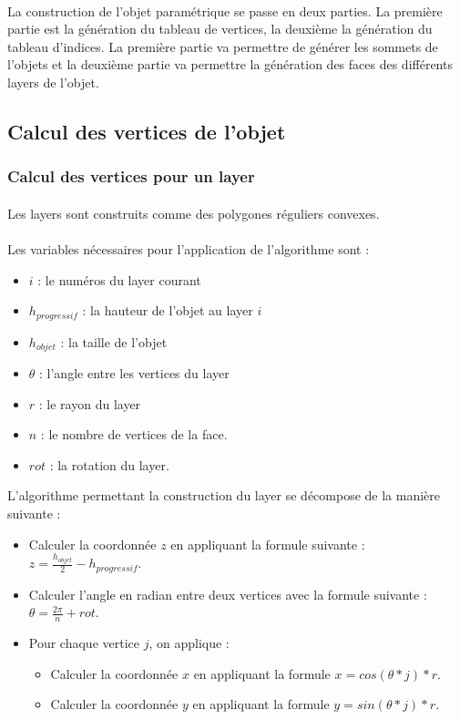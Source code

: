 \documentclass[article, backcover, french, nodocumentinfo]{upmethodology-document}
\begin{document}
	\paragraph{} La construction de l'objet paramétrique se passe en deux parties. La première partie est la génération du tableau de vertices, la deuxième la génération du tableau d'indices. La première partie va permettre de générer les sommets de l'objets et la deuxième partie va permettre la génération des faces des différents layers de l'objet.
	\subsection{Calcul des vertices de l'objet}
	\subsubsection{Calcul des vertices pour un layer}\label{a}
		\paragraph{} Les layers sont construits comme des polygones réguliers convexes.
		\paragraph{}Les variables nécessaires pour l'application de l'algorithme sont : 
		\begin{itemize}
		 	\item $i$ : le numéros du layer courant
		 	\item $h_{progressif}$ : la hauteur de l'objet au layer $i$
		 	\item $h_{objet}$ : la taille de l'objet
		 	\item $\theta$ : l'angle entre les vertices du layer
		 	\item $r$ : le rayon du layer
		 	\item $n$ : le nombre de vertices de la face.
		 	\item $rot$ : la rotation du layer.
		\end{itemize} L'algorithme permettant la construction du layer se décompose de la manière suivante :
		\begin{itemize}
			\item Calculer la coordonnée $z$ en appliquant la formule suivante : $z = \frac{h_{objet}}{2} - h_{progressif}$.
			\item Calculer l'angle en radian entre deux vertices avec la formule suivante : $\theta = \frac{2\pi}{n}+rot$.
			\item Pour chaque vertice $j$, on applique : 
			\begin{itemize}
				\item Calculer la coordonnée $x$ en appliquant la formule $x = cos(\theta*j)*r$.
				\item Calculer la coordonnée $y$ en appliquant la formule $y = sin(\theta*j)*r$.
			\end{itemize}			
		\end{itemize}
\end{document}
